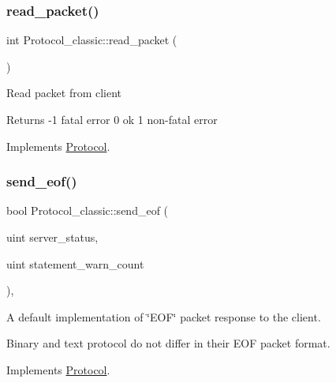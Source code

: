 \subsubsection{\texorpdfstring{read\+\_\+packet()}{read\_packet()}}
{\footnotesize\ttfamily int Protocol\+\_\+classic\+::read\+\_\+packet (\begin{DoxyParamCaption}{ }\end{DoxyParamCaption})\hspace{0.3cm}{\ttfamily [virtual]}}

Read packet from client

\begin{DoxyReturn}{Returns}
-\/1 fatal error 0 ok 1 non-\/fatal error 
\end{DoxyReturn}


Implements \mbox{\hyperlink{classProtocol_a864cc6313ff0a75ce7a69dd7c89de4a7}{Protocol}}.

\mbox{\label{classProtocol__classic_a73b13a1041c96721d6ea08b5fa0eaf50}} 
\subsubsection{\texorpdfstring{send\+\_\+eof()}{send\_eof()}}
{\footnotesize\ttfamily bool Protocol\+\_\+classic\+::send\+\_\+eof (\begin{DoxyParamCaption}\item[{uint}]{server\+\_\+status,  }\item[{uint}]{statement\+\_\+warn\+\_\+count }\end{DoxyParamCaption})\hspace{0.3cm}{\ttfamily [protected]}, {\ttfamily [virtual]}}

A default implementation of \char`\"{}\+E\+O\+F\char`\"{} packet response to the client.

Binary and text protocol do not differ in their E\+OF packet format. 

Implements \mbox{\hyperlink{classProtocol_a9a2cc208a15a3a81f99ace4c1009c01d}{Protocol}}.

\mbox{\label{classProtocol__classic_afb9c6d98e56396be053ba7d1550f2911}} 
